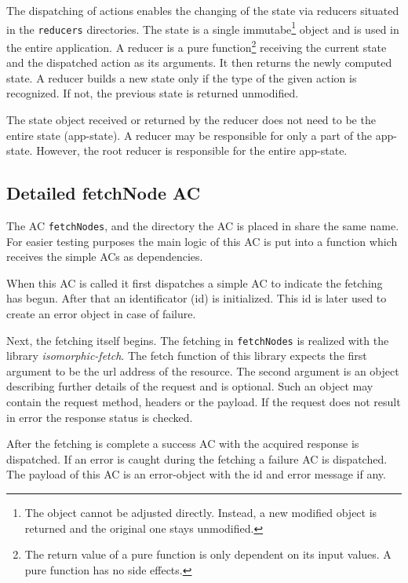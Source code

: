 \begin{appendices}
The dispatching of actions enables the changing of the state via reducers situated in the \texttt{reducers} directories. The state is a single immutabe\footnote{The object cannot be adjusted directly. Instead, a new modified object is returned and the original one stays unmodified.} object and is used in the entire application. A \hypertarget{reducers}{reducer} is a pure function\footnote{The return value of a pure function is only dependent on its input values. A pure function has no side effects.} receiving the current state and the dispatched action as its arguments. It then returns the newly computed state. A reducer builds a new state only if the type of the given action is recognized. If not, the previous state is returned unmodified. 

The state object received or returned by the reducer does not need to be the entire state (app-state). A reducer may be responsible for only a part of the app-state. However, the root reducer is responsible for the entire app-state.

\subsection{Detailed fetchNode AC}\label{dixComplicatedAC}
The AC \texttt{fetchNodes}, and the directory the AC is placed in share the same name. For easier testing purposes the main logic of this AC is put into a function which receives the simple ACs as dependencies. 

When this AC is called it first dispatches a simple AC to indicate the fetching has begun. After that an identificator (id) is initialized. This id is later used to create an error object in case of failure.

 Next, the fetching itself begins. The fetching in \texttt{fetchNodes} is realized with the library \textit{isomorphic-fetch}. The fetch function of this library expects the first argument to be the url address of the resource. The second argument is an object describing further details of the request and is optional. Such an object may contain the request method, headers or the payload. If the request does not result in error the response status is checked. 

After the fetching is complete a success AC with the acquired response is dispatched. If an error is caught during the fetching a failure AC is dispatched. The payload of this AC is an error-object with the id and error message if any.

\end{appendices}